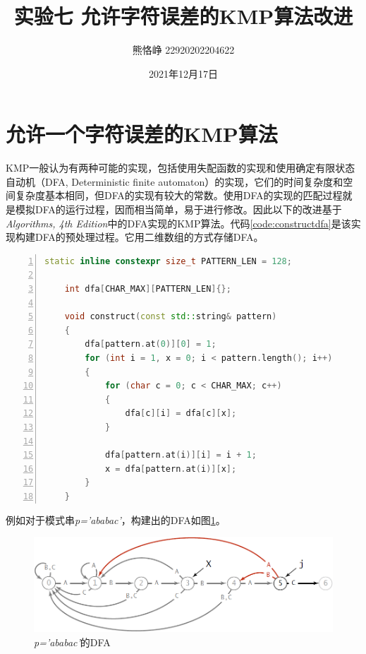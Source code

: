\documentclass[a4paper]{article}
\title{实验七 \space 允许字符误差的KMP算法改进}
\author{熊恪峥 22920202204622}
\date{2021年12月17日}
\begin{document}
	\maketitle
	
	\tableofcontents 
	
	\newpage
	
	\section{允许一个字符误差的KMP算法}
	
	KMP一般认为有两种可能的实现，包括使用失配函数的实现和使用确定有限状态自动机（DFA, Deterministic finite automaton）的实现，它们的时间复杂度和空间复杂度基本相同，但DFA的实现有较大的常数。使用DFA的实现的匹配过程就是模拟DFA的运行过程，因而相当简单，易于进行修改。因此以下的改进基于\textit{Algorithms, 4th Edition}中的DFA实现的KMP算法。代码\ref{code:constructdfa}是该实现构建DFA的预处理过程。它用二维数组的方式存储DFA。
	
	\begin{lstlisting}[language=C++,numbers=left,style=CppStyle,caption=构建DFA的预处理代码,label={code:constructdfa}]
	static inline constexpr size_t PATTERN_LEN = 128;
	
	int dfa[CHAR_MAX][PATTERN_LEN]{};
	
	void construct(const std::string& pattern)
	{
		dfa[pattern.at(0)][0] = 1;
		for (int i = 1, x = 0; i < pattern.length(); i++)
		{
			for (char c = 0; c < CHAR_MAX; c++)
			{
				dfa[c][i] = dfa[c][x];
			}
			
			dfa[pattern.at(i)][i] = i + 1;
			x = dfa[pattern.at(i)][x];
		}
	}
	\end{lstlisting}

	例如对于模式串\textit{p='ababac'}，构建出的DFA如图\ref{fig:dfa}。
	
	\begin{figure}[h]
		\caption{\textit{p='ababac'}的DFA}
		\centering
		\includegraphics{dfa.png}
		
		\label{fig:dfa}
	\end{figure}
\end{document}
